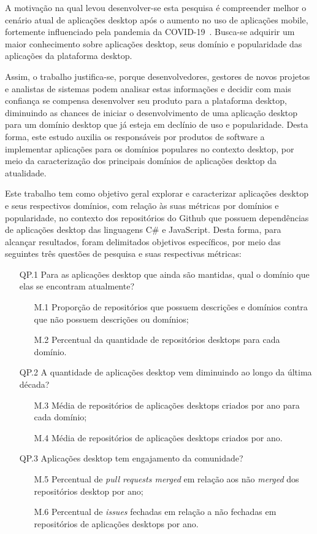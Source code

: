 \documentclass[12pt]{article}
\begin{document}
A motivação na qual levou desenvolver-se esta pesquisa é compreender melhor o cenário atual de aplicações desktop após o aumento no uso de aplicações mobile, fortemente influenciado pela pandemia da COVID-19~\cite{KATSUMATA2022100168}. Busca-se adquirir um maior conhecimento sobre aplicações desktop, seus domínio e popularidade das aplicações da plataforma desktop. 

Assim, o trabalho justifica-se, porque desenvolvedores, gestores de novos projetos e analistas de sistemas podem analisar estas informações e decidir com mais confiança se compensa desenvolver seu produto para a plataforma desktop, diminuindo as chances de iniciar o desenvolvimento de uma aplicação desktop para um domínio desktop que já esteja em declínio de uso e popularidade. Desta forma, este estudo auxilia os responsáveis por produtos de software a implementar aplicações para os domínios populares no contexto desktop, por meio da caracterização dos principais domínios de aplicações desktop da atualidade.

Este trabalho tem como objetivo geral explorar e caracterizar aplicações desktop e seus respectivos domínios, com relação às suas métricas por domínios e popularidade, no contexto dos repositórios do Github que possuem dependências de aplicações desktop das linguagens C\# e JavaScript. Desta forma, para alcançar resultados, foram delimitados objetivos específicos, por meio das seguintes três questões de pesquisa e suas respectivas métricas:

\begin{enumerate}
  \item[QP.1] Para as aplicações desktop que ainda são mantidas, qual o domínio que elas se encontram atualmente?
    \begin{enumerate}
        \item[M.1] Proporção de repositórios que possuem descrições e domínios contra que não possuem descrições ou domínios;
        \item[M.2] Percentual da quantidade de repositórios desktops para cada domínio.
    \end{enumerate}
  \item[QP.2] A quantidade de aplicações desktop vem diminuindo ao longo da última década?
    \begin{enumerate}
        \item[M.3] Média de repositórios de aplicações desktops criados por ano para cada domínio;
        \item[M.4] Média de repositórios de aplicações desktops criados por ano.
    \end{enumerate}
  \item[QP.3] Aplicações desktop tem engajamento da comunidade?
    \begin{enumerate}
        \item[M.5] Percentual de \textit{pull requests merged} em relação aos não \textit{merged} dos repositórios desktop por ano;
        \item[M.6] Percentual de \textit{issues} fechadas em relação a não fechadas em repositórios de aplicações desktops por ano.
    \end{enumerate}
\end{enumerate}
\end{document}
